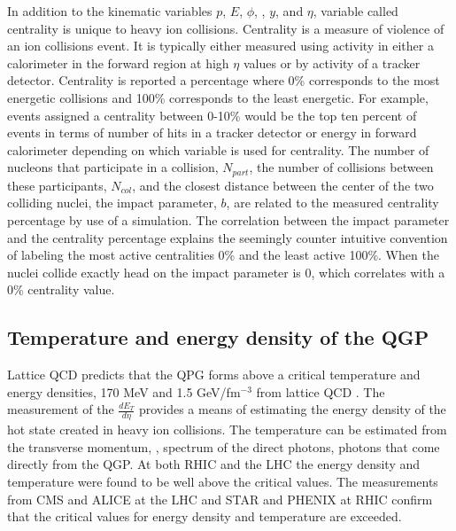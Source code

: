       In addition to the kinematic variables $p$, $E$, $\phi$, \pt, $y$, and 
        $\eta$, variable called centrality is unique to heavy ion collisions. 
      Centrality is a measure of violence of an ion collisions event. 
      It is typically either measured using activity in either a calorimeter in
        the forward region at high $\eta$ values or by activity of a tracker 
        detector.
      Centrality is reported a percentage where 0\% corresponds to the most 
        energetic collisions and 100\% corresponds to the least energetic.
      For example, events assigned a centrality between 0-10\% would be the 
        top ten percent of events in terms of number of hits in a tracker 
        detector or energy in forward calorimeter depending on which variable 
        is used for centrality. 
      The number of nucleons that participate in a collision, $N_{part}$,
        the number of collisions between these participants, $N_{col}$, and the
        closest distance between the center of the two colliding nuclei, the 
        impact parameter, $b$, are related to the measured centrality 
        percentage by use of a simulation. 
      The correlation between the impact parameter and the centrality percentage
        explains the seemingly counter intuitive convention of labeling the 
        most active centralities 0\% and the least active 100\%.
      When the nuclei collide exactly head on the impact parameter is 0, which 
        correlates with a 0\% centrality value. 

    \subsection{Temperature and energy density of the QGP}
      Lattice QCD predicts that the QPG forms above a critical temperature and 
        energy densities, 170 MeV and 1.5 GeV/fm$^{-3}$ from lattice QCD \cite{}.
      The measurement of the $\frac{dE_{T}}{d\eta}$ provides a means of 
        estimating the energy density of the hot state created in heavy ion
        collisions. 
      The temperature can be estimated from the transverse momentum, \pt{}, 
        spectrum of the direct photons, photons that come directly from the 
        QGP.
      At both RHIC and the LHC the energy density and temperature were found to 
        be well above the critical values. 
      The measurements from CMS and ALICE at the LHC and STAR and PHENIX at RHIC
        confirm that the critical values for energy density and temperature are
        exceeded.
  
